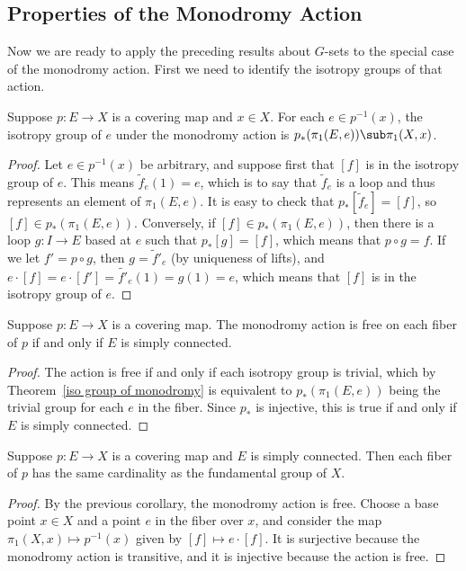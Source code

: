 \subsection{Properties of the Monodromy Action}
Now we are ready to apply the preceding results about $G$-sets to the special case of
the monodromy action. First we need to identify the isotropy groups of that action.
\begin{theorem}\label{iso group of monodromy}
Suppose $p:E\to X$ is a covering map and $x\in X$. For each $e\in p^{-1}(x)$, the isotropy group of $e$ under the monodromy action is $p_*(\pi_1(E,e))\sub\pi_1(X,x)$.
\end{theorem}
\begin{proof}
Let $e\in p^{-1}(x)$ be arbitrary, and suppose first that $[f]$ is in the isotropy
group of $e$. This means $\widetilde{f}_e(1)=e$, which is to say that $\widetilde{f}_e$ is a loop and thus represents an element of $\pi_1(E,e)$. It is easy to check that $p_*[\widetilde{f}_e]=[f]$, so $[f]\in p_*(\pi_1(E,e))$. Conversely, if $[f]\in p_*(\pi_1(E,e))$, then there is a loop $g:I\to E$ based at $e$ such that $p_*[g]=[f]$, which means that $p\circ g=f$. If we let $f'=p\circ g$, then $g=\widetilde{f}'_e$ (by uniqueness of lifts), and $e\cdot[f]=e\cdot[f']=\widetilde{f'}_e(1)=g(1)=e$, which means that $[f]$ is in the isotropy group of $e$.
\end{proof}
\begin{corollary}\label{monodromy action free iff}
Suppose $p:E\to X$ is a covering map. The monodromy action is free on each fiber of $p$ if and only if $E$ is simply connected.
\end{corollary}
\begin{proof}
The action is free if and only if each isotropy group is trivial, which by Theorem~\ref{iso group of monodromy} is equivalent to $p_*(\pi_1(E,e))$ being the trivial group for each $e$ in the fiber. Since $p_*$ is injective, this is true if and only if $E$ is simply connected.
\end{proof}
\begin{corollary}\label{card fund fiber}
Suppose $p:E\to X$ is a covering map and $E$ is simply connected. Then each fiber of $p$ has the same cardinality as the fundamental group of $X$.
\end{corollary}
\begin{proof}
By the previous corollary, the monodromy action is free. Choose a base point $x\in X$ and a point $e$ in the fiber over $x$, and consider the map $\pi_1(X,x)\mapsto p^{-1}(x)$ given by $[f]\mapsto e\cdot[f]$. It is surjective because the monodromy action is transitive, and it is injective because the action is free.
\end{proof}
